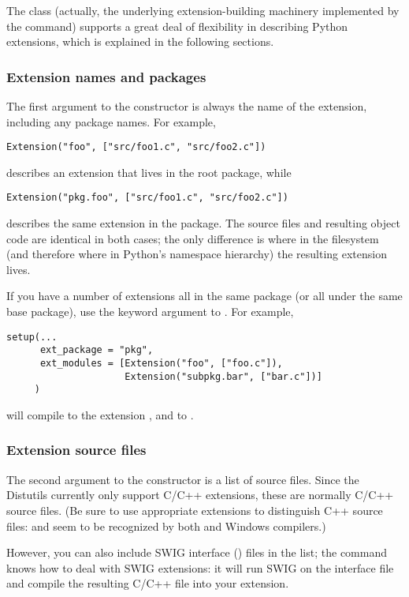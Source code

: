 \documentclass{howto}
\begin{document}
The  class (actually, the underlying extension-building
machinery implemented by the  command) supports a
great deal of flexibility in describing Python extensions, which is
explained in the following sections.  


\subsubsection{Extension names and packages}

The first argument to the  constructor is always the
name of the extension, including any package names.  For example,
\begin{verbatim}
Extension("foo", ["src/foo1.c", "src/foo2.c"])
\end{verbatim}
describes an extension that lives in the root package, while
\begin{verbatim}
Extension("pkg.foo", ["src/foo1.c", "src/foo2.c"])
\end{verbatim}
describes the same extension in the  package.  The source
files and resulting object code are identical in both cases; the only
difference is where in the filesystem (and therefore where in Python's
namespace hierarchy) the resulting extension lives.

If you have a number of extensions all in the same package (or all under
the same base package), use the  keyword argument
to .  For example,
\begin{verbatim}
setup(...
      ext_package = "pkg",
      ext_modules = [Extension("foo", ["foo.c"]),
                     Extension("subpkg.bar", ["bar.c"])]
     )
\end{verbatim}
will compile  to the extension , and
 to .


\subsubsection{Extension source files}

The second argument to the  constructor is a list of
source files.  Since the Distutils currently only support C/C++
extensions, these are normally C/C++ source files.  (Be sure to use
appropriate extensions to distinguish C++ source files:  and
 seem to be recognized by both \UNIX{} and Windows compilers.)

However, you can also include SWIG interface () files in the
list; the  command knows how to deal with SWIG
extensions: it will run SWIG on the interface file and compile the
resulting C/C++ file into your extension.
\end{document}
